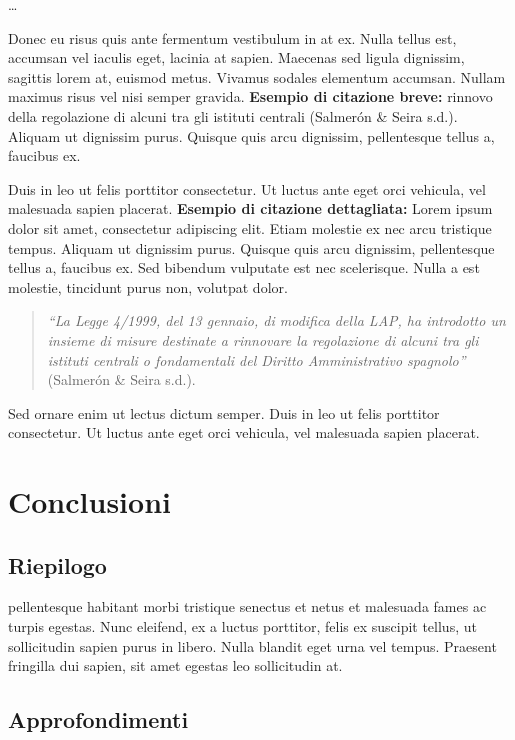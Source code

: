 \documentclass[12pt,it,a4paper,]{report}
\begin{document}
\ldots{}

\newpage

Donec eu risus quis ante fermentum vestibulum in at ex. Nulla tellus
est, accumsan vel iaculis eget, lacinia at sapien. Maecenas sed ligula
dignissim, sagittis lorem at, euismod metus. Vivamus sodales elementum
accumsan. Nullam maximus risus vel nisi semper gravida. \textbf{Esempio
di citazione breve:} rinnovo della regolazione di alcuni tra gli
istituti centrali (Salmerón \& Seira s.d.). Aliquam ut dignissim purus.
Quisque quis arcu dignissim, pellentesque tellus a, faucibus ex.

Duis in leo ut felis porttitor consectetur. Ut luctus ante eget orci
vehicula, vel malesuada sapien placerat. \textbf{Esempio di citazione
dettagliata:} Lorem ipsum dolor sit amet, consectetur adipiscing elit.
Etiam molestie ex nec arcu tristique tempus. Aliquam ut dignissim purus.
Quisque quis arcu dignissim, pellentesque tellus a, faucibus ex. Sed
bibendum vulputate est nec scelerisque. Nulla a est molestie, tincidunt
purus non, volutpat dolor.

\begin{quote}
\emph{``La Legge 4/1999, del 13 gennaio, di modifica della LAP, ha
introdotto un insieme di misure destinate a rinnovare la regolazione di
alcuni tra gli istituti centrali o fondamentali del Diritto
Amministrativo spagnolo''} (Salmerón \& Seira s.d.).
\end{quote}

Sed ornare enim ut lectus dictum semper. Duis in leo ut felis porttitor
consectetur. Ut luctus ante eget orci vehicula, vel malesuada sapien
placerat.

\hypertarget{conclusioni}{%
\chapter{Conclusioni}\label{conclusioni}}

\hypertarget{riepilogo}{%
\section{Riepilogo}\label{riepilogo}}

pellentesque habitant morbi tristique senectus et netus et malesuada
fames ac turpis egestas. Nunc eleifend, ex a luctus porttitor, felis ex
suscipit tellus, ut sollicitudin sapien purus in libero. Nulla blandit
eget urna vel tempus. Praesent fringilla dui sapien, sit amet egestas
leo sollicitudin at.

\hypertarget{approfondimenti}{%
\section{Approfondimenti}\label{approfondimenti}}
\end{document}
